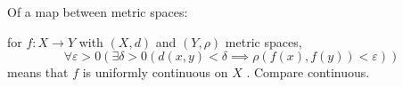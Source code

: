 Of a map between metric spaces:
\par
for  $ f : X \to Y $  with  $ (X,d) $  and
 $ (Y, \rho ) $  metric spaces,
 \[ \forall  \varepsilon >0( \exists  \delta >0(
d(x,y)< \delta  \implies  \rho (f(x),f(y))< \varepsilon )) \] means that
 $ f $  is uniformly continuous on  $ X $ . Compare continuous.


